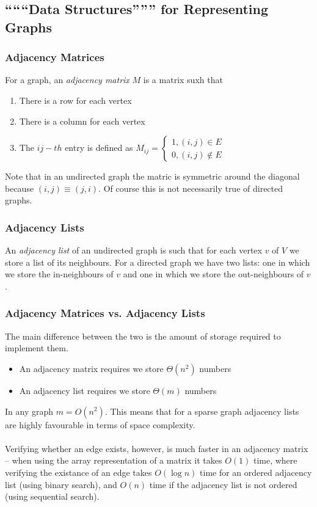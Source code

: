 \documentclass{article}
\newcommand{\ti}[1]{\textit{#1}}
\begin{document}
\subsection{``````Data Structures'''''' for Representing Graphs}
\subsubsection{Adjacency Matrices}
For a graph, an \ti{adjacency matrix} $M$ is a matrix suxh that
\begin{enumerate}
	\item There is a row for each vertex
	\item There is a column for each vertex
	\item The $ij-th$ entry is defined as $M_{ij} = 
\begin{cases}
1, (i, j) \in E\\
0, (i, j) \notin E
\end{cases}$
\end{enumerate}
Note that in an undirected graph the matric is symmetric around the diagonal because $(i, j) \equiv (j, i)$. Of course this is not necessarily true of directed graphs.
\subsubsection{Adjacency Lists}
An \ti{adjacency list} of an undirected graph is such that for each vertex $v$ of $V$ we store a list of its neighbours. For a directed graph we have two lists: one in which we store the in-neighbours of $v$ and one in which we store the out-neighbours of $v$.
\subsubsection{Adjacency Matrices vs. Adjacency Lists}
The main difference between the two is the amount of storage required to implement them.
\begin{itemize}
	\item An adjacency matrix requires we store $\Theta(n^2)$ numbers
	\item An adjacency list requires we store $\Theta(m)$ numbers
\end{itemize}
In any graph $m = O(n^2)$. This means that for a sparse graph adjacency lists are highly favourable in terms of space complexity.\\\\
Verifying whether an edge exists, however, is much faster in an adjacency matrix -- when using the array representation of a matrix it takes $O(1)$ time, where verifying the existance of an edge takes $O(\log n)$ time for an ordered adjacency list (using binary search), and $O(n)$ time if the adjacency list is not ordered (using sequential search).
\newpage
\end{document}
